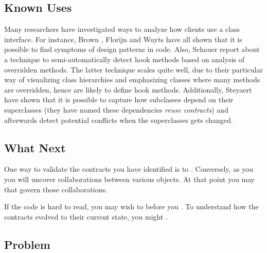 \documentclass[a4paper,10pt,twoside]{book}
\begin{document}
\subsection*{Known Uses}

Many researchers have investigated ways to analyze how clients use a class interface. For instance, Brown \cite{Brow96c}, Florijn \cite{Flor97a} and Wuyts \cite{Wuyt98a} have all shown that it is possible to find symptoms of design patterns in code. Also, Schauer \etal \cite{Scha99a} report about a technique to semi-automatically detect hook methods based on analysis of overridden methods. The latter technique scales quite well, due to their particular way of visualizing class hierarchies and emphasizing classes where many methods are overridden, hence are likely to define hook methods. Additionally, Steyaert \etal \cite{Stey96a} have shown that it is possible to capture how subclasses depend on their superclasses (they have named these dependencies \emph{reuse contracts}) and afterwards detect potential conflicts when the superclasses gets changed.

\subsection*{What Next}

One way to validate the contracts you have identified is to . Conversely, as you  you will uncover collaborations between various objects. At that point you may  that govern those collaborations.

If the code is hard to read, you may wish to  before you . To understand how the contracts evolved to their current state, you might .



\subsection*{Problem}
\end{document}
